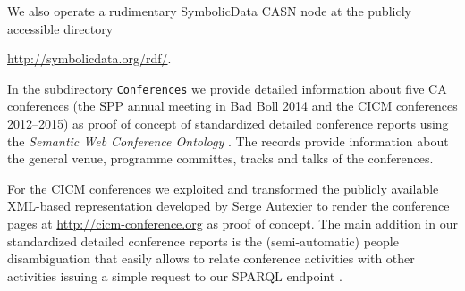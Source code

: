 \documentclass{llncs}
\newcommand{\SD}{{\sc Symbo\-lic\-Data}}
\begin{document}
We also operate a rudimentary {\SD} CASN node at the publicly accessible
directory
\begin{center}
  \url{http://symbolicdata.org/rdf/}.
\end{center}
In the subdirectory \texttt{Conferences} we provide detailed information about
five CA conferences (the SPP annual meeting in Bad Boll 2014 and the CICM
conferences 2012--2015) as proof of concept of standardized detailed
conference reports using the \emph{Semantic Web Conference Ontology}
\cite{swc}.  The records provide information about the general venue,
programme committes, tracks and talks of the conferences.  

For the CICM conferences we exploited and transformed the publicly available
XML-based representation developed by Serge Autexier to render the conference
pages at \url{http://cicm-conference.org} as proof of concept.  The main
addition in our standardized detailed conference reports is the
(semi-automatic) people disambiguation that easily allows to relate conference
activities with other activities issuing a simple request to our SPARQL
endpoint \cite{sdsparql}.  
\end{document}
